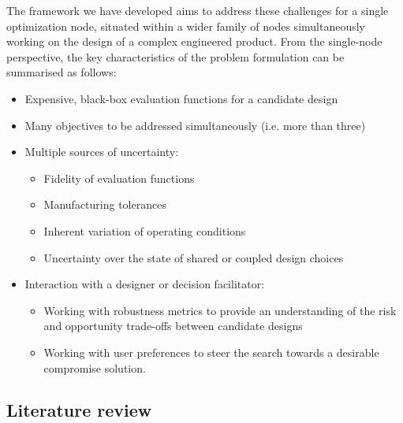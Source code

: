 \documentclass[10pt]{llncs}
\begin{document}
The framework we have developed aims to address these challenges for a single optimization node, situated within a wider family of nodes simultaneously working on the design of a complex engineered product. From the single-node perspective, the key characteristics of the problem formulation can be summarised as follows: 
\begin{itemize}
	\item Expensive, black-box evaluation functions for a candidate design
	\item Many objectives to be addressed simultaneously (i.e. more than three)
	\item Multiple sources of uncertainty:
		\begin{itemize}
			\item Fidelity of evaluation functions
			\item Manufacturing tolerances
			\item Inherent variation of operating conditions
			\item Uncertainty over the state of shared or coupled design choices
		\end{itemize}
	\item Interaction with a designer or decision facilitator:
		\begin{itemize}
			\item Working with robustness metrics to provide an understanding of the risk and 						  opportunity trade-offs between candidate designs
			\item Working with user preferences to steer the search towards a desirable 				 	 		  compromise solution.
		\end{itemize}
\end{itemize}


\subsection{\label{sec:intro}Literature review}
\end{document}
